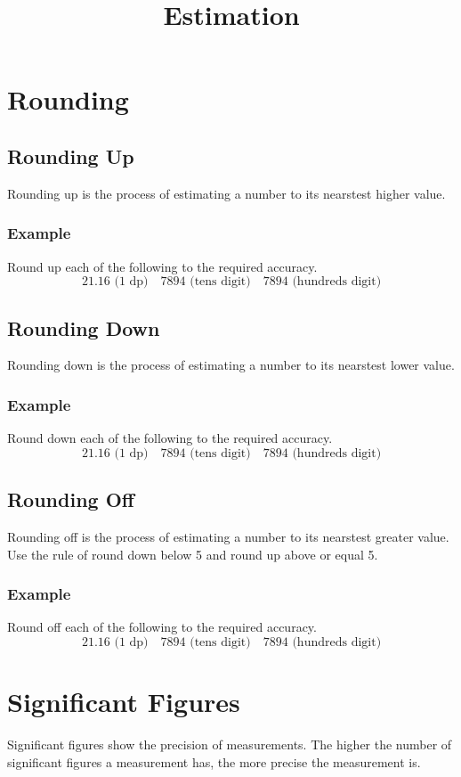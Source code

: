 \documentclass[a4paper,12pt]{article}
\title{Estimation}
\author{}
\date{}
\begin{document}
\maketitle

\section{Rounding}
\subsection{Rounding Up}
Rounding up is the process of estimating a number to its nearstest higher value.
\subsubsection{Example}
Round up each of the following to the required accuracy.
\[21.16\text{ (1 dp)}\quad7894\text{ (tens digit)}\quad7894\text{ (hundreds digit)}\]

\newpage

\subsection{Rounding Down}
Rounding down is the process of estimating a number to its nearstest lower value.
\subsubsection{Example}
Round down each of the following to the required accuracy.
\[21.16\text{ (1 dp)}\quad7894\text{ (tens digit)}\quad7894\text{ (hundreds digit)}\]
\subsection{Rounding Off}
Rounding off is the process of estimating a number to its nearstest greater value. Use the rule of round down below 5 and round up above or equal 5.
\subsubsection{Example}
Round off each of the following to the required accuracy.
\[21.16\text{ (1 dp)}\quad7894\text{ (tens digit)}\quad7894\text{ (hundreds digit)}\]

\newpage

\section{Significant Figures}
Significant figures show the precision of measurements. The higher the number of significant figures a measurement has, the more precise the measurement is.
\end{document}
